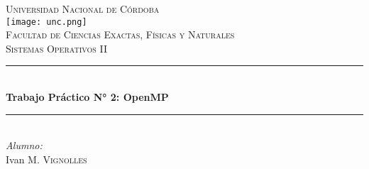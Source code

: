 \documentclass[12pt]{article}
\begin{document}
\begin{titlepage}
\newcommand{\HRule}{\rule{\linewidth}{0.5mm}} %

\center %
 

\textsc{\LARGE Universidad Nacional de C\'ordoba}\\[1.5cm] %
\texttt{[image: unc.png]}\\[1cm] %
\textsc{\Large Facultad de Ciencias Exactas, F\'isicas y Naturales}\\[0.5cm] %
\textsc{\large Sistemas Operativos II}\\[0.5cm] %


\HRule \\[0.4cm]
{ \LARGE \bfseries Trabajo Pr\'actico N° 2: OpenMP}\\[0.4cm] %
\HRule \\[1.5cm]
 



\Large \emph{Alumno:}\\
Ivan M. \textsc{Vignolles}\\[1.5cm] %


\end{titlepage}
\end{document}

